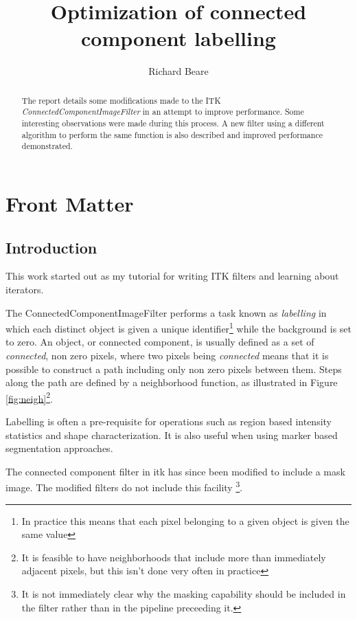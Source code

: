 \documentclass{InsightArticle}
\title{Optimization of connected component labelling}
\author{Richard Beare}
\begin{document}
\maketitle

\ifhtml
\chapter*{Front Matter\label{front}}
\fi


\begin{abstract}
\noindent
The report details some modifications made to the ITK 
{\em ConnectedComponentImageFilter} in an attempt to improve
performance. Some interesting observations were made during this
process. A new filter using a different algorithm to perform the same
function is also described and improved performance demonstrated.
\end{abstract}

\tableofcontents

\lstset{language=c++}
\maketitle
\section{Introduction}
This work started out as my tutorial for writing ITK filters and
learning about iterators. 

The ConnectedComponentImageFilter performs a task known as {\em
labelling} in which each distinct object is given a unique
identifier\footnote{In practice this means that each pixel belonging
to a given object is given the same value} while the background is set
to zero. An object, or connected component, is usually defined as a
set of {\em connected}, non zero pixels, where two pixels being {\em
connected} means that it is possible to construct a path including
only non zero pixels between them. Steps along the path are defined by
a neighborhood function, as illustrated in Figure \ref{fig:neigh}\footnote{It
is feasible to have neighborhoods that include more than immediately
adjacent pixels, but this isn't done very often in practice}.

Labelling is often a pre-requisite for operations such as region based
intensity statistics and shape characterization. It is also useful
when using marker based segmentation approaches.

The connected component filter in itk has since been modified to
include a mask image. The modified filters do not include this
facility \footnote{It is not immediately clear why the masking
capability should be included in the filter rather than in the
pipeline preceeding it.}.
\end{document}
